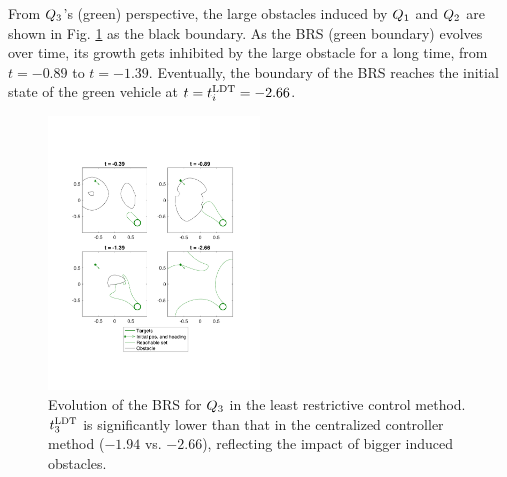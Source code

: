 From $Q_3$'s (green) perspective, the large obstacles induced by $Q_1$ and $Q_2$ are shown in Fig. \ref{fig:lrc_rs3} as the black boundary. As the BRS (green boundary) evolves over time, its growth gets inhibited by the large obstacle for a long time, from $t=-0.89$ to $t=-1.39$. Eventually, the boundary of the BRS reaches the initial state of the green vehicle at $t = t^\text{LDT}_i = -2.66$.

\begin{figure}[h]
  \centering
  \includegraphics[width=0.5\textwidth]{"fig/lrc_rs3"}
  \caption{Evolution of the BRS for $Q_3$ in the least restrictive control method. $t^\text{LDT}_3$ is significantly lower than that in the centralized controller method ($-1.94$ vs. $-2.66$), reflecting the impact of bigger induced obstacles.}
  \label{fig:lrc_rs3}
\end{figure}